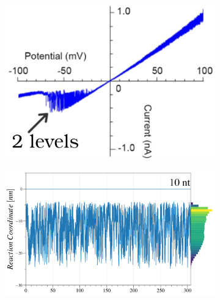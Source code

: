 \begin{figure}[ht!]
  \begin{centering}
  \hspace{.35cm}
  \begin{subfigure}[t]{\dimexpr.3\linewidth-1.3em\relax}
  \centering
  \vspace{-0.1cm}
  \includegraphics[width=1.05\linewidth,valign=t]{Figures/IV-90.png}
  \end{subfigure}%
  \hspace{.25cm}
  \vspace{-0.2cm}
  \begin{subfigure}[t]{\dimexpr.46\linewidth-1.3em\relax}
  \centering
  \includegraphics[width=.95\linewidth,valign=t]{Figures/MR-90.png}
  \end{subfigure}%
  \hspace{.3cm}
  \begin{subfigure}[t]{\dimexpr.21\linewidth-1.3em\relax}

\end{subfigure}
\end{centering}
\end{figure}
